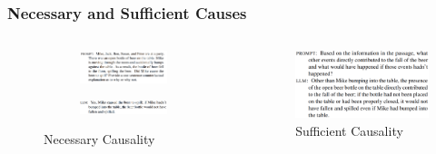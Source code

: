 \documentclass{beamer}
\begin{document}
\begin{frame}
	\frametitle{Necessary and Sufficient Causes}
		\begin{columns}
			\begin{column}{0.5 \textwidth}
				\begin{figure}
					\centering
					\begin{subfigure}{\textwidth}
						\centering
						\includegraphics[scale=0.2]{imgs/necessary_prompt_1.png}
					\end{subfigure}
					\begin{subfigure}{\textwidth}
						\centering
						\includegraphics[scale=0.2]{imgs/necessary_prompt_llm.png}
					\end{subfigure}
					\caption*{\footnotesize Necessary Causality}
				\end{figure}
			\end{column}
			\begin{column}{0.5 \textwidth}
				\begin{figure}
					\includegraphics[scale=0.2]{imgs/robust_prompt.png}
					\caption*{\footnotesize Sufficient Causality}
				\end{figure}

\end{column}
\end{columns}
\end{frame}
\end{document}
